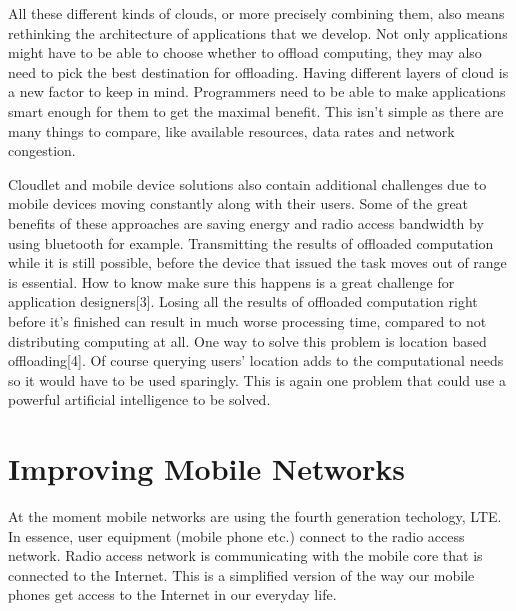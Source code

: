 \documentclass[conference]{IEEEtran}
\begin{document}
\par
All these different kinds of clouds, or more precisely combining them, also means rethinking the architecture of applications that we develop. Not only applications might have to be able to choose whether to offload computing, they may also need to pick the best destination for offloading. Having different layers of cloud is a new factor to keep in mind. Programmers need to be able to make applications smart enough for them to get the maximal benefit. This isn't simple as there are many things to compare, like available resources, data rates and network congestion.
\par
Cloudlet and mobile device solutions also contain additional challenges due to mobile devices moving constantly along with their users. Some of the great benefits of these approaches are saving energy and radio access bandwidth by using bluetooth for example. Transmitting the results of offloaded computation while it is still possible, before the device that issued the task moves out of range is essential. How to know make sure this happens is a great challenge for application designers[3]. Losing all the results of offloaded computation right before it's finished can result in much worse processing time, compared to not distributing computing at all. One way to solve this problem is location based offloading[4]. Of course querying users' location adds to the computational needs so it would have to be used sparingly. This is again one problem that could use a powerful artificial intelligence to be solved.

\section{Improving Mobile Networks}
At the moment mobile networks are using the fourth generation techology, LTE. In essence, user equipment (mobile phone etc.) connect to the radio access network. Radio access network is communicating with the mobile core that is connected to the Internet. This is a simplified version of the way our mobile phones get access to the Internet in our everyday life.
\end{document}
